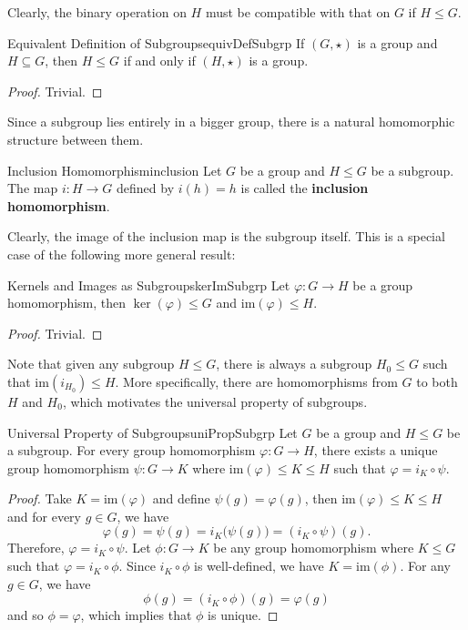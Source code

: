 \documentclass[math]{amznotes}
\theoremstyle{remark}
\newcommand{\kernel}[1]{\ker\left(#1\right)}
\newcommand{\img}[1]{\mathrm{im}\left(#1\right)}
\newcommand{\0}{\mathbf{0}}
\newcommand{\1}{\mathbf{1}}
\begin{document}
Clearly, the binary operation on $H$ must be compatible with that on $G$ if $H \leq G$.
\begin{probox}{Equivalent Definition of Subgroups}{equivDefSubgrp}
    If $\left(G, \star\right)$ is a group and $H \subseteq G$, then $H \leq G$ if and only if $\left(H, \star\right)$ is a group.
    \tcblower
    \begin{proof}
        Trivial.
    \end{proof}    
\end{probox}
Since a subgroup lies entirely in a bigger group, there is a natural homomorphic structure between them.
\begin{dfnbox}{Inclusion Homomorphism}{inclusion}
    Let $G$ be a group and $H \leq G$ be a subgroup. The map $i \colon H \to G$ defined by $i\left(h\right) = h$ is called the {\color{red} \textbf{inclusion homomorphism}}.
\end{dfnbox}
Clearly, the image of the inclusion map is the subgroup itself. This is a special case of the following more general result:
\begin{probox}{Kernels and Images as Subgroups}{kerImSubgrp}
    Let $\varphi \colon G \to H$ be a group homomorphism, then $\kernel{\varphi} \leq G$ and $\img{\varphi} \leq H$.
    \tcblower
    \begin{proof}
        Trivial.
    \end{proof}
\end{probox}
Note that given any subgroup $H \leq G$, there is always a subgroup $H_0 \leq G$ such that $\img{i_{H_0}} \leq H$. More specifically, there are homomorphisms from $G$ to both $H$ and $H_0$, which motivates the universal property of subgroups.
\begin{thmbox}{Universal Property of Subgroups}{uniPropSubgrp}
    Let $G$ be a group and $H \leq G$ be a subgroup. For every group homomorphism $\varphi \colon G \to H$, there exists a unique group homomorphism $\psi \colon G \to K$ where $\img{\varphi} \leq K \leq H$ such that $\varphi = i_{K} \circ \psi$.
    \tcblower
    \begin{proof}
        Take $K = \img{\varphi}$ and define $\psi\left(g\right) = \varphi\left(g\right)$, then $\img{\varphi} \leq K \leq H$ and for every $g \in G$, we have 
        \begin{equation*}
            \varphi\left(g\right) = \psi\left(g\right) = i_K\bigl(\psi\left(g\right)\bigr) = \left(i_K \circ \psi\right)\left(g\right).
        \end{equation*}
        Therefore, $\varphi = i_K \circ \psi$. Let $\phi \colon G \to K$ be any group homomorphism where $K \leq G$ such that $\varphi = i_K \circ \phi$. Since $i_K \circ \phi$ is well-defined, we have $K = \img{\phi}$. For any $g \in G$, we have 
        \begin{equation*}
            \phi\left(g\right) = \left(i_K \circ \phi\right)\left(g\right) = \varphi\left(g\right)
        \end{equation*}
        and so $\phi = \varphi$, which implies that $\phi$ is unique.
    \end{proof}
\end{thmbox}
\end{document}
